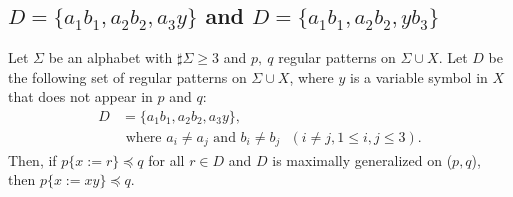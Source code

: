 \subsection{$D = \{ a_{1}b_{1}, a_{2}b_{2}, a_{3}y\}$ and $D = \{ a_{1}b_{1}, a_{2}b_{2}, yb_{3}\}$}\label{subsec:d3b}


\begin{lem}\label{lem:3consts_i}
  Let $\Sigma$ be an alphabet with $\sharp\Sigma \ge 3$ and $p,~q$ regular patterns on $\Sigma\cup X$.
  Let $D$ be the following set of regular patterns on $\Sigma\cup X$, where $y$ is a variable symbol in $X$ that does not appear in $p$ and $q$:
  \begin{align*}
  D & = \{ a_{1}b_{1}, a_{2}b_{2}, a_{3}y\},\\
  & \mbox{ where } a_{i} \ne a_{j} \mbox{ and } b_{i} \ne b_{j} \mbox{ } (i\ne j, 1\le i,j\le 3).
  \end{align*}
  Then, if $p \{ x := r \} \preceq q$ for all $r \in D$ and $D$ is maximally generalized on ($p,q$), then $p \{ x := xy \} \preceq q$.
\end{lem}

